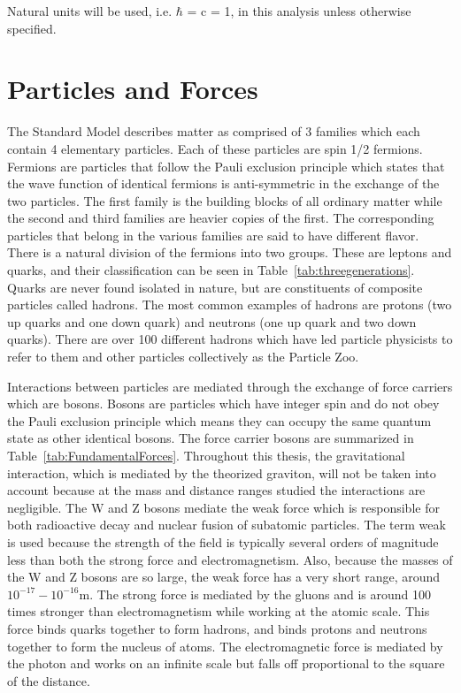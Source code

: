 Natural units will be used, i.e. $\hbar$ = c = 1, in this analysis unless otherwise specified.


\section{Particles and Forces}

The Standard Model describes matter as comprised of 3 families which each contain 4 elementary particles.  Each of these particles are spin 1/2 fermions. Fermions are particles that follow the Pauli exclusion principle which states that the wave function of identical fermions is anti-symmetric in the exchange of the two particles\cite{Griffiths:2004}.  The first family is the building blocks of all ordinary matter while the second and third families are heavier copies of the first.  The corresponding particles that belong in the various families are said to have different flavor.  There is a natural division of the fermions into two groups.  These are leptons and quarks, and their classification can be seen in Table~\ref{tab:threegenerations}.  Quarks are never found isolated in nature, but are constituents of composite particles called hadrons.  The most common examples of hadrons are protons (two up quarks and one down quark) and neutrons (one up quark and two down quarks).  There are over 100 different hadrons which have led particle physicists to refer to them and other particles collectively as the Particle Zoo.%

Interactions between particles are mediated through the exchange of force carriers which are bosons.  Bosons are particles which have integer spin and do not obey the Pauli exclusion principle which means they can occupy the same quantum state as other identical bosons.  The force carrier bosons are summarized in Table~\ref{tab:FundamentalForces}.  Throughout this thesis, the gravitational interaction, which is mediated by the theorized graviton, will not be taken into account because at the mass and distance ranges studied the interactions are negligible. The W and Z bosons mediate the weak force which is responsible for both radioactive decay and nuclear fusion of subatomic particles. The term weak is used because the strength of the field is typically several orders of magnitude less than both the strong force and electromagnetism.  Also, because the masses of the W and Z bosons are so large, the weak force has a very short range, around $10^{-17} - 10^{-16}$m\cite{Christman:2001}.  The strong force is mediated by the gluons and is around 100 times stronger than electromagnetism while working at the atomic scale.  This force binds quarks together to form hadrons, and binds protons and neutrons together to form the nucleus of atoms. The electromagnetic force is mediated by the photon and works on an infinite scale but falls off proportional to the square of the distance.  

